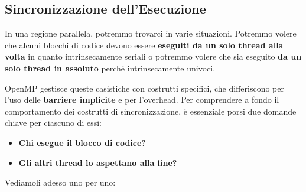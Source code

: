 \subsection{Sincronizzazione dell'Esecuzione}
In una regione parallela, potremmo trovarci in varie situazioni. Potremmo volere che alcuni blocchi di codice devono essere \textbf{eseguiti da un solo thread alla volta} in quanto intrinsecamente seriali o potremmo volere che sia eseguito \textbf{da un solo thread in assoluto} perché intrinsecamente univoci. 

OpenMP gestisce queste casistiche con costrutti specifici, che differiscono per l'uso delle \textbf{barriere implicite} e per l'overhead. Per comprendere a fondo il comportamento dei costrutti di sincronizzazione, è essenziale porsi due domande chiave per ciascuno di essi:
\begin{itemize}
    \item \textbf{Chi esegue il blocco di codice?}
    \item \textbf{Gli altri thread lo aspettano alla fine?}
\end{itemize}
Vediamoli adesso uno per uno:

